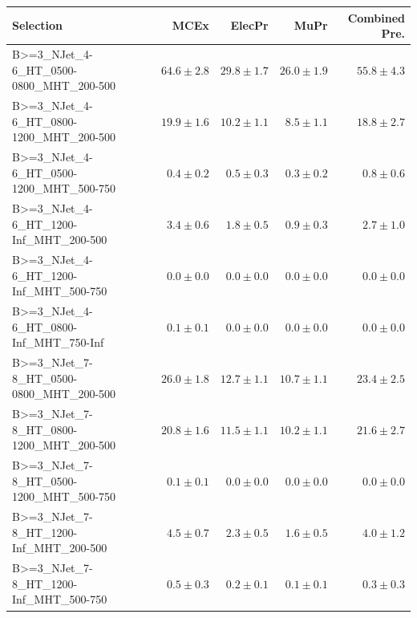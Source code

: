 \documentclass{beamer}
\begin{document}
\begin{frame}
\tiny
\begin{tabular}{lrrrr}
\toprule

                                                Selection  &                     MCEx  &           ElecPr  &             MuPr  &          Combined Pre.  \\ 
\midrule
     B>=3\_NJet\_4-6\_HT\_0500-0800\_MHT\_200-500 &              $64.6\pm2.8$&              $29.8\pm1.7$&              $26.0\pm1.9$&                  $55.8\pm4.3$ \\ 
     B>=3\_NJet\_4-6\_HT\_0800-1200\_MHT\_200-500 &              $19.9\pm1.6$&              $10.2\pm1.1$&               $8.5\pm1.1$&                  $18.8\pm2.7$ \\ 
     B>=3\_NJet\_4-6\_HT\_0500-1200\_MHT\_500-750 &               $0.4\pm0.2$&               $0.5\pm0.3$&               $0.3\pm0.2$&                   $0.8\pm0.6$ \\ 
      B>=3\_NJet\_4-6\_HT\_1200-Inf\_MHT\_200-500 &               $3.4\pm0.6$&               $1.8\pm0.5$&               $0.9\pm0.3$&                   $2.7\pm1.0$ \\ 
      B>=3\_NJet\_4-6\_HT\_1200-Inf\_MHT\_500-750 &               $0.0\pm0.0$&               $0.0\pm0.0$&               $0.0\pm0.0$&                   $0.0\pm0.0$ \\ 
      B>=3\_NJet\_4-6\_HT\_0800-Inf\_MHT\_750-Inf &               $0.1\pm0.1$&               $0.0\pm0.0$&               $0.0\pm0.0$&                   $0.0\pm0.0$ \\ 
     B>=3\_NJet\_7-8\_HT\_0500-0800\_MHT\_200-500 &              $26.0\pm1.8$&              $12.7\pm1.1$&              $10.7\pm1.1$&                  $23.4\pm2.5$ \\ 
     B>=3\_NJet\_7-8\_HT\_0800-1200\_MHT\_200-500 &              $20.8\pm1.6$&              $11.5\pm1.1$&              $10.2\pm1.1$&                  $21.6\pm2.7$ \\ 
     B>=3\_NJet\_7-8\_HT\_0500-1200\_MHT\_500-750 &               $0.1\pm0.1$&               $0.0\pm0.0$&               $0.0\pm0.0$&                   $0.0\pm0.0$ \\ 
      B>=3\_NJet\_7-8\_HT\_1200-Inf\_MHT\_200-500 &               $4.5\pm0.7$&               $2.3\pm0.5$&               $1.6\pm0.5$&                   $4.0\pm1.2$ \\ 
      B>=3\_NJet\_7-8\_HT\_1200-Inf\_MHT\_500-750 &               $0.5\pm0.3$&               $0.2\pm0.1$&               $0.1\pm0.1$&                   $0.3\pm0.3$ \\ 

\end{tabular}
\end{frame}
\end{document}
